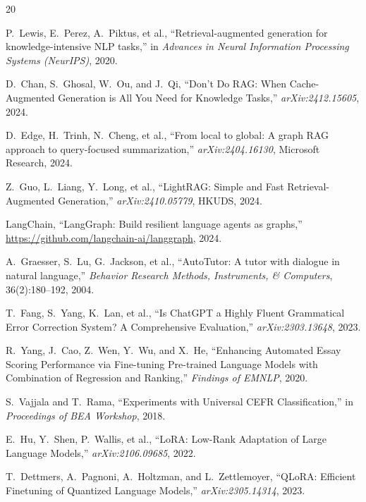 \documentclass[11pt,a4paper,twocolumn]{article}
\begin{document}
\begin{thebibliography}{20}

P.~Lewis, E.~Perez, A.~Piktus, et al., ``Retrieval-augmented generation for knowledge-intensive NLP tasks,'' in \textit{Advances in Neural Information Processing Systems (NeurIPS)}, 2020.

D.~Chan, S.~Ghosal, W.~Ou, and J.~Qi, ``Don't Do RAG: When Cache-Augmented Generation is All You Need for Knowledge Tasks,'' \textit{arXiv:2412.15605}, 2024.

D.~Edge, H.~Trinh, N.~Cheng, et al., ``From local to global: A graph RAG approach to query-focused summarization,'' \textit{arXiv:2404.16130}, Microsoft Research, 2024.

Z.~Guo, L.~Liang, Y.~Long, et al., ``LightRAG: Simple and Fast Retrieval-Augmented Generation,'' \textit{arXiv:2410.05779}, HKUDS, 2024.

LangChain, ``LangGraph: Build resilient language agents as graphs,'' \url{https://github.com/langchain-ai/langgraph}, 2024.

A.~Graesser, S.~Lu, G.~Jackson, et al., ``AutoTutor: A tutor with dialogue in natural language,'' \textit{Behavior Research Methods, Instruments, \& Computers}, 36(2):180--192, 2004.

T.~Fang, S.~Yang, K.~Lan, et al., ``Is ChatGPT a Highly Fluent Grammatical Error Correction System? A Comprehensive Evaluation,'' \textit{arXiv:2303.13648}, 2023.

R.~Yang, J.~Cao, Z.~Wen, Y.~Wu, and X.~He, ``Enhancing Automated Essay Scoring Performance via Fine-tuning Pre-trained Language Models with Combination of Regression and Ranking,'' \textit{Findings of EMNLP}, 2020.

S.~Vajjala and T.~Rama, ``Experiments with Universal CEFR Classification,'' in \textit{Proceedings of BEA Workshop}, 2018.

E.~Hu, Y.~Shen, P.~Wallis, et al., ``LoRA: Low-Rank Adaptation of Large Language Models,'' \textit{arXiv:2106.09685}, 2022.

T.~Dettmers, A.~Pagnoni, A.~Holtzman, and L.~Zettlemoyer, ``QLoRA: Efficient Finetuning of Quantized Language Models,'' \textit{arXiv:2305.14314}, 2023.


\end{thebibliography}
\end{document}
